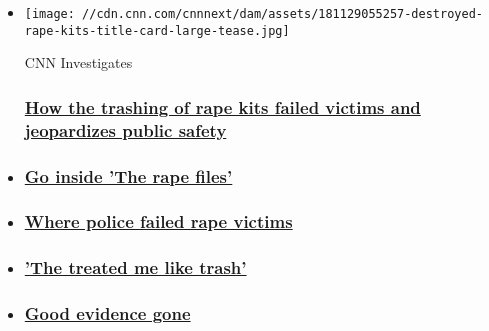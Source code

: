 \begin{itemize}
\item
  \href{https://www.cnn.com/destroyed}{}

  \texttt{[image: //cdn.cnn.com/cnnnext/dam/assets/181129055257-destroyed-rape-kits-title-card-large-tease.jpg]}

  CNN Investigates

  \hypertarget{how-the-trashing-of-rape-kits-failed-victims-and-jeopardizes-public-safety}{%
  \subsubsection{\texorpdfstring{\href{https://www.cnn.com/destroyed}{How
  the trashing of rape kits failed victims and jeopardizes public
  safety}}{How the trashing of rape kits failed victims and jeopardizes public safety}}\label{how-the-trashing-of-rape-kits-failed-victims-and-jeopardizes-public-safety}}
\item
  \hypertarget{go-inside-the-rape-files}{%
  \subsubsection{\texorpdfstring{\href{https://www.cnn.com/interactive/2018/11/investigates/police-destroyed-rapekits/case-files.html}{Go
  inside 'The rape
  files'}}{Go inside 'The rape files'}}\label{go-inside-the-rape-files}}
\item
  \hypertarget{where-police-failed-rape-victims}{%
  \subsubsection{\texorpdfstring{\href{https://www.cnn.com/interactive/2018/11/investigates/police-destroyed-rapekits/springfield.html}{Where
  police failed rape
  victims}}{Where police failed rape victims}}\label{where-police-failed-rape-victims}}
\item
  \hypertarget{the-treated-me-like-trash}{%
  \subsubsection{\texorpdfstring{\href{https://www.cnn.com/interactive/2018/11/investigates/police-destroyed-rapekits/treated-me-like-trash.html}{'The
  treated me like
  trash'}}{'The treated me like trash'}}\label{the-treated-me-like-trash}}
\item
  \hypertarget{good-evidence-gone}{%
  \subsubsection{\texorpdfstring{\href{https://www.cnn.com/interactive/2018/11/investigates/police-destroyed-rapekits/good-evidence-gone.html}{Good
  evidence gone}}{Good evidence gone}}\label{good-evidence-gone}}
\end{itemize}


